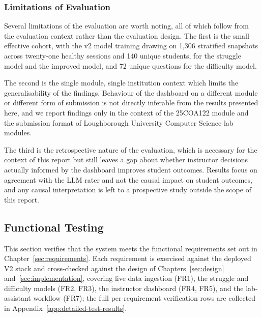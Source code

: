 \subsubsection{Limitations of Evaluation}
Several limitations of the evaluation are worth noting, all of which follow from the evaluation context rather than the evaluation design. 
The first is the small effective cohort, with the v2 model training drawing on 1{,}306 stratified snapshots across twenty-one healthy sessions and 140 unique students, for the struggle model and the improved model, and 72 unique questions for the difficulty model.

The second is the single module, single institution context which limits the generalisability of the findings. 
Behaviour of the dashboard on a different module or different form of submission is not directly inferable from the results presented here, and we report findings only in the context of the 25COA122 module and the submission format of Loughborough University Computer Science lab modules. 

The third is the retrospective nature of the evaluation, which is necessary for the context of this report but still leaves a gap about whether instructor decisions actually informed by the dashboard improves student outcomes. Results focus on agreement with the LLM rater and not the causal impact on student outcomes, and any causal interpretation is left to a prospective study outside the scope of this report.


\subsection{Functional Testing} \label{sec:eval-functional}

This section verifies that the system meets the functional requirements set out in Chapter~\ref{sec:requirements}. 
Each requirement is exercised against the deployed V2 stack and cross-checked against the design of Chapters~\ref{sec:design} and~\ref{sec:implementation}, covering live data ingestion (FR1), the struggle and difficulty models (FR2, FR3), the instructor dashboard (FR4, FR5), and the lab-assistant workflow (FR7); the full per-requirement verification rows are collected in Appendix~\ref{app:detailed-test-results}.



